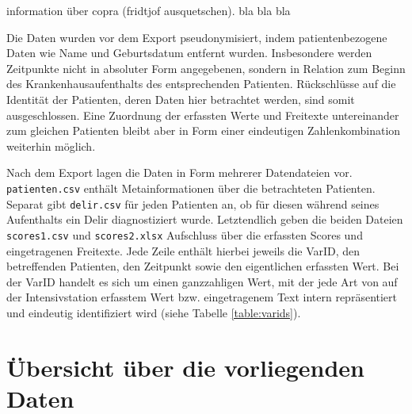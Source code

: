 information über copra (fridtjof ausquetschen). bla bla bla

Die Daten wurden vor dem Export pseudonymisiert, indem patientenbezogene Daten wie Name und Geburtsdatum entfernt wurden. Insbesondere werden Zeitpunkte nicht in absoluter Form angegebenen, sondern in Relation zum Beginn des Krankenhausaufenthalts des entsprechenden Patienten. Rückschlüsse auf die Identität der Patienten, deren Daten hier betrachtet werden, sind somit ausgeschlossen. Eine Zuordnung der erfassten Werte und Freitexte untereinander zum gleichen Patienten bleibt aber in Form einer eindeutigen Zahlenkombination weiterhin möglich.

Nach dem Export lagen die Daten in Form mehrerer Datendateien vor. \texttt{patienten.csv} enthält Metainformationen über die betrachteten Patienten. Separat gibt \texttt{delir.csv} für jeden Patienten an, ob für diesen während seines Aufenthalts ein Delir diagnostiziert wurde. Letztendlich geben die beiden Dateien \texttt{scores1.csv} und \texttt{scores2.xlsx} Aufschluss über die erfassten Scores und eingetragenen Freitexte. Jede Zeile enthält hierbei jeweils die VarID, den betreffenden Patienten, den Zeitpunkt sowie den eigentlichen erfassten Wert. Bei der VarID handelt es sich um einen ganzzahligen Wert, mit der jede Art von auf der Intensivstation erfasstem Wert bzw. eingetragenem Text intern repräsentiert und eindeutig identifiziert wird (siehe Tabelle \ref{table:varids}).

\section{Übersicht über die vorliegenden Daten} \label{section:vorliegende_daten}

